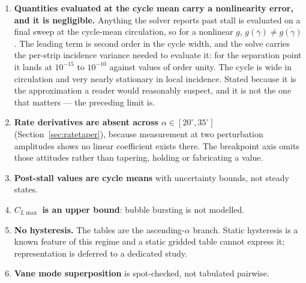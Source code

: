 \documentclass[11pt,a4paper]{article}
\newcommand{\dg}{^\circ}
\begin{document}
\begin{enumerate}
This is \emph{not} a classical hysteresis loop, and the distinction
matters for how the model is built. A two-valued system would show the
branches parting across the whole post-stall range and rejoining at its
ends; instead six of the seven cluster in $18$--$35\dg$, the branches
agree at $16\dg$ and $20\dg$ \emph{inside} that band, and agree exactly
from $40$ through $70\dg$. The signature is isolated bistable conditions
rather than two branches --- the same one the incidence-step refinement
produced. The tables therefore need no branch axis; the affected
attitudes need wider uncertainty, and $1.65\%$ sits well inside the
$\pm10$--$20\%$ already carried on the parasite buildup. One departure,
$1.76\%$ of $C_Z$ at $\alpha = 80\dg$, falls outside the stall band and
is recorded without an explanation.

\item \textbf{Quantities evaluated at the cycle mean carry a
nonlinearity error, and it is negligible.} Anything the solver reports
past stall is evaluated on a final sweep at the cycle-mean circulation,
so for a nonlinear $g$, $g(\bar\gamma) \neq \overline{g(\gamma)}$. The
leading term is second order in the cycle width, and the solve carries
the per-strip incidence variance needed to evaluate it: for the
separation point it lands at $10^{-15}$ to $10^{-10}$ against values of
order unity. The cycle is wide in circulation and very nearly stationary
in local incidence. Stated because it is the approximation a reader would
reasonably suspect, and it is not the one that matters --- the preceding
limit is.

\item \textbf{Rate derivatives are absent across
$\alpha \in [20\dg, 35\dg]$} (Section~\ref{sec:ratetaper}), because
measurement at two perturbation amplitudes shows no linear coefficient
exists there. The breakpoint axis omits those attitudes rather than
tapering, holding or fabricating a value.
\item \textbf{Post-stall values are cycle means} with uncertainty bounds,
not steady states.
\item \textbf{$C_{L\max}$ is an upper bound}: bubble bursting is not
modelled.
\item \textbf{No hysteresis.} The tables are the ascending-$\alpha$
branch. Static hysteresis is a known feature of this regime and a static
gridded table cannot express it; representation is deferred to a
dedicated study.
\item \textbf{Vane mode superposition} is spot-checked, not tabulated
pairwise.
\end{enumerate}
\end{document}
